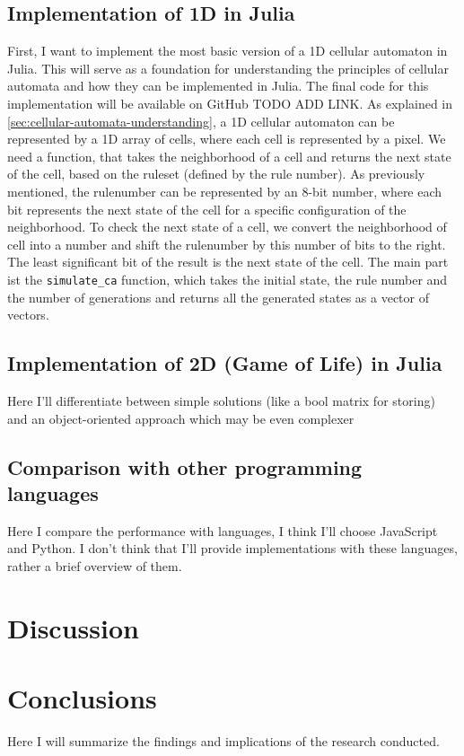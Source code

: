 \documentclass[a4paper,12pt]{llncs}
\numberwithin{equation}{section}
\begin{document}
\subsection{Implementation of 1D in Julia}
First, I want to implement the most basic version of a 1D cellular automaton in Julia.
This will serve as a foundation for understanding the principles of cellular automata and how they can be implemented in Julia.
The final code for this implementation will be available on GitHub TODO ADD LINK.
As explained in \autoref{sec:cellular-automata-understanding}, a 1D cellular automaton can be represented by a 1D array of cells, where each cell is represented by a pixel.
We need a function, that takes the neighborhood of a cell and returns the next state of the cell, based on the ruleset (defined by the rule number).
As previously mentioned, the rulenumber can be represented by an 8-bit number, where each bit represents the next state of the cell for a specific configuration of the neighborhood.
To check the next state of a cell, we convert the neighborhood of cell into a number and shift the rulenumber by this number of bits to the right. The least significant bit of the result is the next state of the cell.
The main part ist the \texttt{simulate\_ca} function, which takes the initial state, the rule number and the number of generations and returns all the generated states as a vector of vectors.

\subsection{Implementation of 2D (Game of Life) in Julia}
Here I'll differentiate between simple solutions (like a bool matrix for storing)
and an object-oriented approach which may be even complexer
\subsection{Comparison with other programming languages}
Here I compare the performance with languages, I think I'll choose JavaScript and Python.
I don't think that I'll provide implementations with these languages, rather a brief overview of them.
\section{Discussion}
\section{Conclusions}
Here I will summarize the findings and implications of the research conducted.



\end{document}
